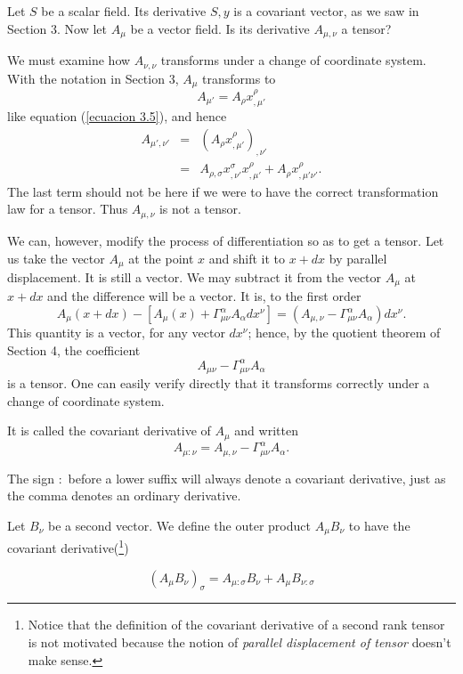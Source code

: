 Let $S$ be a scalar field. Its derivative $S,y$ is a covariant vector, as we 
saw in Section 3. Now let $A_\mu$ be a vector field. Is its derivative 
$A_{\mu,\nu}$ a tensor?

We must examine how $A_{\nu,\nu}$ transforms under a change of coordinate 
system. With the notation in Section 3, $A_\mu$ transforms to
\[
 A_{\mu'} = A_\rho x^\rho _{,\mu'}
\]
like equation (\ref{ecuacion 3.5}), and hence
\[
 \begin{array}{rcl}
  A_{\mu',\nu'} & = & \left( A_\rho x^\rho _{,\mu'} \right)_{,\nu'}\\
                & = & A_{\rho,\sigma} x^\sigma_{,\nu'} x^\rho_{,\mu'}
                + A_\rho x^\rho_{,\mu'\nu'} .
 \end{array}
\]
The last term should not be here if we were to have the correct transformation 
law for a tensor. Thus $A_{\mu,\nu}$ is not a tensor.

We can, however, modify the process of differentiation so as to get a tensor. 
Let us take the vector $A_\mu$ at the point $x$ and shift it to $x+dx$ by 
parallel displacement. It is still a vector. We may subtract it from the vector 
$A_\mu$ at $x+dx$ and the difference will be a vector. It is, to the first order
\[
 A_{\mu}(x + dx) - \left[ A_{\mu}(x) + \Gamma^\alpha_{\mu\nu}A_\alpha 
dx^\nu\right] = \left(A_{\mu,\nu} - \Gamma^\alpha_{\mu\nu} A_\alpha 
\right)dx^\nu .
\]
This quantity is a vector, for any vector $dx^\nu$; hence, by the quotient 
theorem of Section 4, the coefficient
\[
 A_{\mu\nu} - \Gamma^\alpha_{\mu\nu} A_\alpha
\]
is a tensor. One can easily verify directly that it transforms correctly under 
a change of coordinate system.

It is called the covariant derivative of $A_\mu$ and written
\begin{equation}
 \label{ecuacion 10.1}
 A_{\mu:\nu} = A_{\mu,\nu} - \Gamma^\alpha_{\mu\nu}A_\alpha. 
\end{equation}

The sign $:$ before a lower suffix will always denote a covariant derivative, 
just as the comma denotes an ordinary derivative.

Let $B_{\nu}$ be a second vector. We define the outer product $A_{\mu}B_{\nu}$ 
to have the covariant derivative(\footnote{Notice that the definition of the  
covariant derivative of a second rank tensor is not motivated because the 
notion of \emph{parallel displacement of tensor} doesn't make sense. })

\begin{equation}
 \label{ecuacion 10.2}
 \left(A_{\mu} B_{\nu} \right)_{\sigma} =
     A_{\mu:\sigma}B_{\nu} + A_{\mu} B_{\nu:\sigma}
\end{equation}

